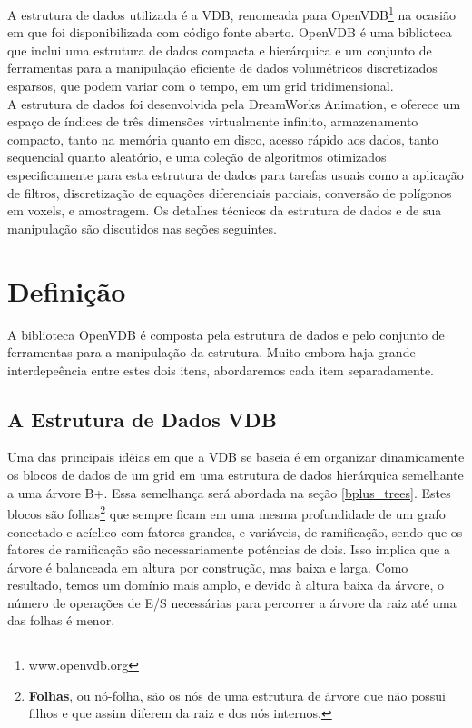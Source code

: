 
A estrutura de dados utilizada é a VDB, renomeada para OpenVDB\footnote{www.openvdb.org} na ocasião em que foi disponibilizada com código fonte aberto. OpenVDB é uma biblioteca que inclui uma estrutura de dados compacta e hierárquica e um conjunto de ferramentas para a manipulação eficiente de dados volumétricos discretizados esparsos, que podem variar com o tempo, em um grid tridimensional. \\

A estrutura de dados foi desenvolvida pela DreamWorks Animation, e oferece um espaço de índices de três dimensões virtualmente infinito, armazenamento compacto, tanto na memória quanto em disco, acesso rápido aos dados, tanto sequencial quanto aleatório, e uma coleção de algoritmos otimizados especificamente para esta estrutura de dados para tarefas usuais como a aplicação de filtros, discretização de equações diferenciais parciais, conversão de polígonos em voxels, e amostragem. Os detalhes técnicos da estrutura de dados e de sua manipulação são discutidos nas seções seguintes.

\section{Definição}
A biblioteca OpenVDB é composta pela estrutura de dados e pelo conjunto de ferramentas para a manipulação da estrutura. Muito embora haja grande interdepeência entre estes dois itens, abordaremos cada item separadamente.

\subsection{A Estrutura de Dados VDB}
\label{vdb_data}

Uma das principais idéias em que a VDB se baseia é em organizar dinamicamente os blocos de dados de um grid em uma estrutura de dados hierárquica semelhante a uma árvore B+. Essa semelhança será abordada na seção \ref{bplus_trees}. Estes blocos são folhas\footnote{{\bf Folhas}, ou nó-folha, são os nós de uma estrutura de árvore que não possui filhos e que assim diferem da raiz e dos nós internos.} que sempre ficam em uma mesma profundidade de um grafo conectado e acíclico com fatores grandes, e variáveis, de ramificação, sendo que os fatores de ramificação são necessariamente potências de dois. Isso implica que a árvore é balanceada em altura por construção, mas baixa e larga. Como resultado, temos um domínio mais amplo, e devido à altura baixa da árvore, o número de operações de E/S necessárias para percorrer a árvore da raiz até uma das folhas é menor. \\

